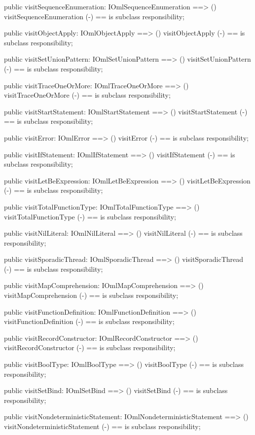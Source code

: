 \begin{vdm_al}
  public visitSequenceEnumeration: IOmlSequenceEnumeration ==> ()
  visitSequenceEnumeration (-) == is subclass responsibility;

  public visitObjectApply: IOmlObjectApply ==> ()
  visitObjectApply (-) == is subclass responsibility;

  public visitSetUnionPattern: IOmlSetUnionPattern ==> ()
  visitSetUnionPattern (-) == is subclass responsibility;

  public visitTraceOneOrMore: IOmlTraceOneOrMore ==> ()
  visitTraceOneOrMore (-) == is subclass responsibility;

  public visitStartStatement: IOmlStartStatement ==> ()
  visitStartStatement (-) == is subclass responsibility;

  public visitError: IOmlError ==> ()
  visitError (-) == is subclass responsibility;

  public visitIfStatement: IOmlIfStatement ==> ()
  visitIfStatement (-) == is subclass responsibility;

  public visitLetBeExpression: IOmlLetBeExpression ==> ()
  visitLetBeExpression (-) == is subclass responsibility;

  public visitTotalFunctionType: IOmlTotalFunctionType ==> ()
  visitTotalFunctionType (-) == is subclass responsibility;

  public visitNilLiteral: IOmlNilLiteral ==> ()
  visitNilLiteral (-) == is subclass responsibility;

  public visitSporadicThread: IOmlSporadicThread ==> ()
  visitSporadicThread (-) == is subclass responsibility;

  public visitMapComprehension: IOmlMapComprehension ==> ()
  visitMapComprehension (-) == is subclass responsibility;

  public visitFunctionDefinition: IOmlFunctionDefinition ==> ()
  visitFunctionDefinition (-) == is subclass responsibility;

  public visitRecordConstructor: IOmlRecordConstructor ==> ()
  visitRecordConstructor (-) == is subclass responsibility;

  public visitBoolType: IOmlBoolType ==> ()
  visitBoolType (-) == is subclass responsibility;

  public visitSetBind: IOmlSetBind ==> ()
  visitSetBind (-) == is subclass responsibility;

  public visitNondeterministicStatement: IOmlNondeterministicStatement ==> ()
  visitNondeterministicStatement (-) == is subclass responsibility;


\end{vdm_al}
